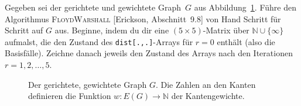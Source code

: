\documentclass{uebung_cs}
\begin{document}
\begin{aufgabe}
  Gegeben sei der gerichtete und gewichtete Graph~$G$ aus Abbildung~\ref{example_graph}.
  Führe den Algorithmus \textsc{FloydWarshall} [Erickson, Abschnitt~9.8] von Hand Schritt für Schritt auf $G$ aus. 
  Beginne, indem du dir eine $(5\times 5)$-Matrix über $\mathbb N\cup\{\infty\}$ aufmalst, die den Zustand des \texttt{dist[.,.]}-Arrays für $r=0$ enthält (also die Basisfälle).
  Zeichne danach jeweils den Zustand des Arrays nach den Iterationen $r=1,2,\dots,5$.

\begin{figure}[ht]
	\begin{center}
		\caption{\label{example_graph}Der gerichtete, gewichtete Graph $G$. Die Zahlen an den Kanten definieren die Funktion $w\colon E(G)\to\mathbb N$ der Kantengewichte.}
	\end{center}
\end{figure}
\end{aufgabe}
\end{document}
